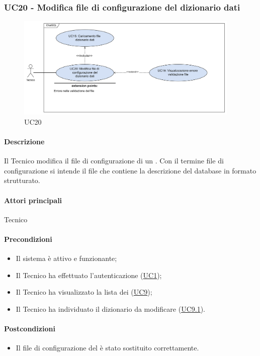 \subsubsection{UC20 - Modifica file di configurazione del dizionario dati}\label{UC20}

\begin{figure}[H]
  \centering
  \includegraphics[width=0.95\textwidth]{assets/uc20.png}
  \caption{UC20}
\end{figure}

\paragraph*{Descrizione}
Il Tecnico modifica il file di configurazione di un . Con il termine file di configurazione si intende il file che contiene la descrizione del database in formato strutturato. 

\paragraph*{Attori principali}
Tecnico

\paragraph*{Precondizioni}
\begin{itemize}
  \item Il sistema è attivo e funzionante;
  \item Il Tecnico ha effettuato l'autenticazione (\hyperref[UC1]{UC1});
  \item Il Tecnico ha visualizzato la lista dei  (\hyperref[UC9]{UC9});
  \item Il Tecnico ha individuato il dizionario da modificare (\hyperref[UC9.1]{UC9.1}).
\end{itemize}

\paragraph*{Postcondizioni}
\begin{itemize}
  \item Il file di configurazione del  è stato sostituito correttamente.
\end{itemize}

